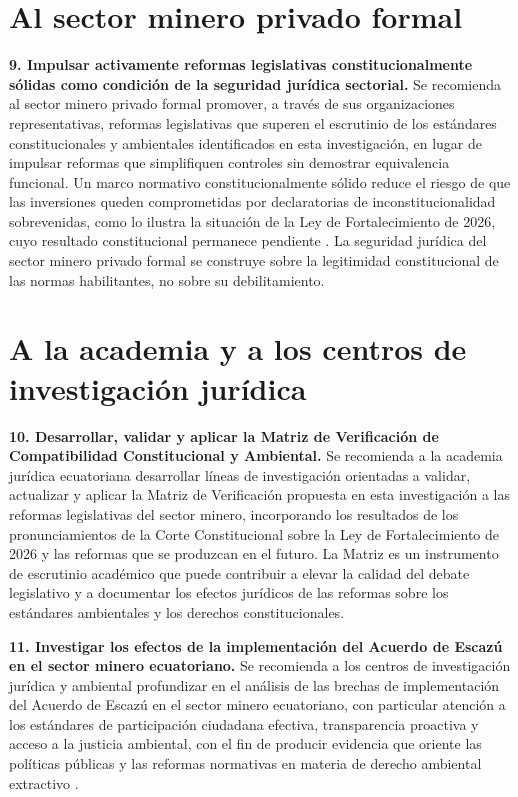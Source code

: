 \section*{Al sector minero privado formal}

\textbf{9. Impulsar activamente reformas legislativas constitucionalmente sólidas como condición de la seguridad jurídica sectorial.} Se recomienda al sector minero privado formal promover, a través de sus organizaciones representativas, reformas legislativas que superen el escrutinio de los estándares constitucionales y ambientales identificados en esta investigación, en lugar de impulsar reformas que simplifiquen controles sin demostrar equivalencia funcional. Un marco normativo constitucionalmente sólido reduce el riesgo de que las inversiones queden comprometidas por declaratorias de inconstitucionalidad sobrevenidas, como lo ilustra la situación de la Ley de Fortalecimiento de 2026, cuyo resultado constitucional permanece pendiente \parencite{primicias_demandas_2026}. La seguridad jurídica del sector minero privado formal se construye sobre la legitimidad constitucional de las normas habilitantes, no sobre su debilitamiento.

\section*{A la academia y a los centros de investigación jurídica}

\textbf{10. Desarrollar, validar y aplicar la Matriz de Verificación de Compatibilidad Constitucional y Ambiental.} Se recomienda a la academia jurídica ecuatoriana desarrollar líneas de investigación orientadas a validar, actualizar y aplicar la Matriz de Verificación propuesta en esta investigación a las reformas legislativas del sector minero, incorporando los resultados de los pronunciamientos de la Corte Constitucional sobre la Ley de Fortalecimiento de 2026 y las reformas que se produzcan en el futuro. La Matriz es un instrumento de escrutinio académico que puede contribuir a elevar la calidad del debate legislativo y a documentar los efectos jurídicos de las reformas sobre los estándares ambientales y los derechos constitucionales.

\textbf{11. Investigar los efectos de la implementación del Acuerdo de Escazú en el sector minero ecuatoriano.} Se recomienda a los centros de investigación jurídica y ambiental profundizar en el análisis de las brechas de implementación del Acuerdo de Escazú en el sector minero ecuatoriano, con particular atención a los estándares de participación ciudadana efectiva, transparencia proactiva y acceso a la justicia ambiental, con el fin de producir evidencia que oriente las políticas públicas y las reformas normativas en materia de derecho ambiental extractivo \parencite{acuerdo_escazu_2018}.

